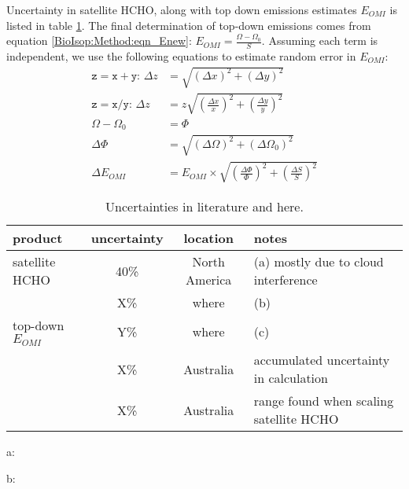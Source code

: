   Uncertainty in satellite HCHO, along with top down emissions estimates $E_{OMI}$ is listed in table \ref{BioIsop:Uncertainty:tab_uncertainties}.
  The final determination of top-down emissions comes from equation \ref{BioIsop:Method:eqn_Enew}: $E_{OMI}=\frac{\Omega - \Omega_{0}}{S}$.
  Assuming each term is independent, we use the following equations to estimate random error in $E_{OMI}$:
  \begin{align*}
    \mathtt{z=x+y:} \, \Delta{z} & = \sqrt{(\Delta{x})^2 + (\Delta{y})^2} \\
    \mathtt{z=x/y:} \, \Delta{z} & = z \sqrt{(\frac{\Delta{x}}{x})^2 + (\frac{\Delta{y}}{y})^2} \\
    \Omega - \Omega_{0} & = \Phi \\
    \Delta{\Phi} & = \sqrt{(\Delta{\Omega})^2 + (\Delta{\Omega_{0}})^2} \\
    \Delta{E_{OMI}} &= E_{OMI} \times \sqrt{(\frac{\Delta{\Phi}}{\Phi})^2 + (\frac{\Delta{S}}{S})^2}
  \end{align*}
  \begin{table}\begin{threeparttable}
    \caption{Uncertainties in literature and here.}
    \begin{tabular}{ l | c  c  l } 
      \toprule
      product & uncertainty & location & notes \\
      \midrule
      satellite HCHO & 40\% & North America & (a) mostly due to cloud interference \\
       & X\% & where & (b) \\
      top-down $E_{OMI}$ & Y\% & where & (c) \\
       & X\% & Australia & accumulated uncertainty in calculation \\
       & X\% & Australia & range found when scaling satellite HCHO \\
      \bottomrule
    \end{tabular}
    \begin{tablenotes} 
      \item a: \textcite{Millet2006,Palmer2006}
      \item b: 
    \end{tablenotes}
    \label{BioIsop:Uncertainty:tab_uncertainties}
  \end{threeparttable}\end{table}
  
